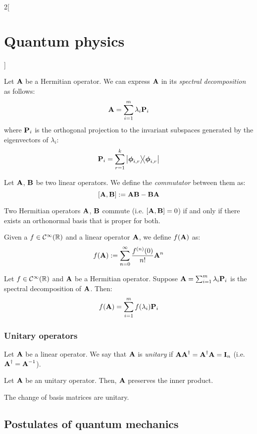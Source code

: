 \documentclass[../../../main.tex]{subfiles}
\begin{document}
\begin{multicols}{2}[\section{Quantum physics}]
\begin{definition}
  \end{definition}
  \begin{proposition}
    Let $\boldsymbol{\mathrm{A}}$ be a Hermitian operator. We can express $\boldsymbol{\mathrm{A}}$ in its \emph{spectral decomposition} as follows: $$\boldsymbol{\mathrm{A}}=\sum_{i=1}^m\lambda_i\boldsymbol{\mathrm{P}}_i$$
    where $\boldsymbol{\mathrm{P}}_i$ is the orthogonal projection to the invariant subspaces generated by the eigenvectors of $\lambda_i$: $$\vf{P}_i=\sum_{r=1}^k\dyad{\vf\phi_{i,r}}{\vf\phi_{i,r}}$$
  \end{proposition}
  \begin{definition}[Commutator]
    Let $\boldsymbol{\mathrm{A}}$, $\boldsymbol{\mathrm{B}}$ be two linear operators. We define the \emph{commutator} between them as: $$[\boldsymbol{\mathrm{A}},\boldsymbol{\mathrm{B}}]:=\boldsymbol{\mathrm{AB}}-\boldsymbol{\mathrm{BA}}$$
  \end{definition}
  \begin{theorem}
    Two Hermitian operators $\boldsymbol{\mathrm{A}}$, $\boldsymbol{\mathrm{B}}$ commute (i.e. $[\boldsymbol{\mathrm{A}},\boldsymbol{\mathrm{B}}]=0$) if and only if there exists an orthonormal basis that is proper for both.
  \end{theorem}
  \begin{definition}
    Given a $f\in\mathcal{C}^\infty(\mathbb{R})$ and a linear operator $\boldsymbol{\mathrm{A}}$, we define $f(\boldsymbol{\mathrm{A}})$ as: $$f(\boldsymbol{\mathrm{A}}):=\sum_{n=0}^\infty \frac{f^{(n)}(0)}{n!}\boldsymbol{\mathrm{A}}^n$$
  \end{definition}
  \begin{proposition}
    Let $f\in\mathcal{C}^\infty(\mathbb{R})$ and $\boldsymbol{\mathrm{A}}$ be a Hermitian operator. Suppose $\boldsymbol{\mathrm{A}}=\sum_{i=1}^m\lambda_i\boldsymbol{\mathrm{P}}_i$ is the spectral decomposition of $\boldsymbol{\mathrm{A}}$. Then: $$f(\boldsymbol{\mathrm{A}})=\sum_{i=1}^mf(\lambda_i)\boldsymbol{\mathrm{P}}_i$$
  \end{proposition}
  \subsubsection{Unitary operators}
  \begin{definition}
    Let $\boldsymbol{\mathrm{A}}$ be a linear operator. We say that $\boldsymbol{\mathrm{A}}$ is \emph{unitary} if $\boldsymbol{\mathrm{A}}\boldsymbol{\mathrm{A}}^\dag=\boldsymbol{\mathrm{A}}^\dag\boldsymbol{\mathrm{A}}=\boldsymbol{\mathrm{I}}_n$ (i.e. $\boldsymbol{\mathrm{A}}^\dag=\boldsymbol{\mathrm{A}}^{-1}$).
  \end{definition}
  \begin{proposition}
    Let $\boldsymbol{\mathrm{A}}$ be an unitary operator. Then, $\boldsymbol{\mathrm{A}}$ preserves the inner product.
  \end{proposition}
  \begin{proposition}
    The change of basis matrices are unitary.
  \end{proposition}
  \subsection{Postulates of quantum mechanics}

\end{multicols}
\end{document}
